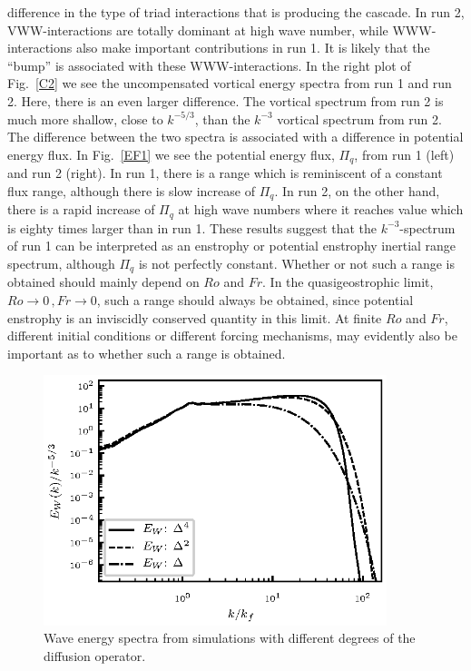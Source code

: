 {difference in the type of triad interactions that is producing the cascade. In run 2,
VWW-interactions are totally dominant at high wave number, while WWW-interactions also
make important contributions in run 1. It is likely that the ``bump'' is associated with
these WWW-interactions. In the right plot of Fig.~\ref{C2} we see the uncompensated
vortical energy spectra from run 1 and run 2. Here, there is an even larger difference.
The vortical spectrum from run 2 is much more shallow, close to $ k^{-5/3} $,  than the
$ k^{-3} $ vortical spectrum from run 2. The difference between the two spectra is
associated with a difference in potential energy flux. In Fig.~\ref{EF1} we see the
potential energy flux, $ \Pi_q $,  from run 1 (left) and run 2 (right). In run 1,  there
is a range  which is reminiscent of a constant flux range, although there is slow
increase of  $ \Pi_q $. In run 2, on the other hand, there is a rapid increase of $
\Pi_q $ at high wave numbers where it reaches value which is eighty times larger than in
run 1. These results suggest that the $ k^{-3} $-spectrum of run 1 can be interpreted as
an enstrophy or potential enstrophy inertial range spectrum, although $ \Pi_q $ is not
perfectly constant. Whether or not such a range is obtained should mainly depend on $ Ro
$ and $ Fr $. In the quasigeostrophic limit, $ Ro \rightarrow 0 \, , Fr \rightarrow 0 $,
such a range should always be obtained, since potential enstrophy is an inviscidly
conserved quantity in this limit. At finite $ Ro $ and $ Fr $, different initial
conditions or different forcing mechanisms, may evidently also be important as to
whether such a range is obtained.}

\begin{figure}[h]
\centerline{\includegraphics[angle=0,width=10cm]{./fig4.eps}}
 \caption{Wave energy spectra from simulations with different degrees of the diffusion operator.  }
 \label{Comp1}
 \end{figure}
 
